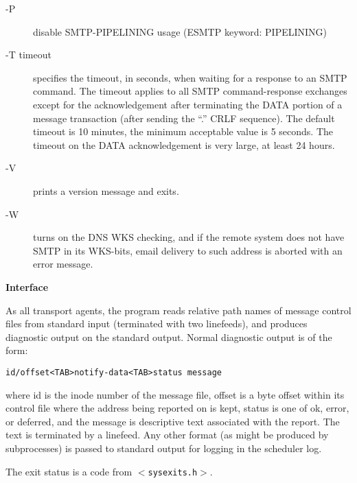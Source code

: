 \begin{description}
\item[-P] \mbox{}

disable SMTP-PIPELINING usage (ESMTP keyword: PIPELINING)



\item[-T timeout] \mbox{}

specifies the timeout, in seconds, when waiting for
a response to an SMTP command. The timeout applies
to all SMTP command-response exchanges except for
the acknowledgement after terminating the DATA portion 
of a message transaction (after sending the
``.'' CRLF sequence). The default timeout is 10 
minutes, the minimum acceptable value is 5 seconds.
The timeout on the DATA acknowledgement is very
large, at least 24 hours.



\item[-V] \mbox{}

prints a version message and exits.



\item[-W] \mbox{}

turns on the DNS WKS checking, and if the remote
system does not have SMTP in its WKS-bits, email
delivery to such address is aborted with an error
message.

\end{description}


{\bf Interface}

As all transport agents, the program reads relative path
names of message control files from standard input 
(terminated with two linefeeds), and produces diagnostic output
on the standard output. Normal diagnostic output is of
the form:

\begin{tscreen}
\begin{verbatim}
id/offset<TAB>notify-data<TAB>status message
\end{verbatim}
\end{tscreen}


where id is the inode number of the message file, offset
is a byte offset within its control file where the address
being reported on is kept, status is one of ok, error, or
deferred, and the message is descriptive text associated
with the report. The text is terminated by a linefeed.
Any other format (as might be produced by subprocesses) is
passed to standard output for logging in the scheduler
log.

The exit status is a code from {\tt {\(<\)}sysexits.h{\(>\)}}.

